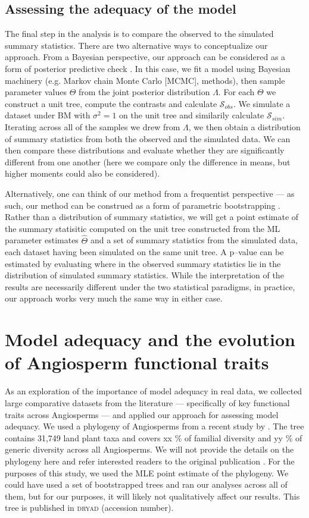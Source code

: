 \documentclass[a4paper,12pt]{article}
\begin{document}
\subsection{Assessing the adequacy of the model}
The final step in the analysis is to compare the observed to the simulated summary statistics. There are two alternative ways to conceptualize our approach. From a Bayesian perspective, our approach can be considered as a form of posterior predictive check \citep{Rubin1984, Gelman1996, Gelmanbook}. In this case, we fit a model using Bayesian machinery (e.g. Markov chain Monte Carlo [MCMC], methods), then sample parameter values $\Theta$ from the joint posterior distribution $\Lambda$. For each $\Theta$ we construct a unit tree, compute the contrasts and calculate $\mathcal{S}_{obs}$. We simulate a dataset under BM with $\sigma^2 = 1$ on the unit tree and similarily calculate $\mathcal{S}_{sim}$. Iterating across all of the samples we drew from $\Lambda$, we then obtain a distribution of summary statistics from both the observed and the simulated data. We can then compare these distributions and evaluate whether they are significantly different from one another (here we compare only the difference in means, but higher moments could also be considered). 

Alternatively, one can think of our method from a frequentist perspective --- as such, our method can be construed as a form of parametric bootstrapping \citep{Efronbootstrap}. Rather than a distribution of summary statistics, we will get a point estimate of the summary statisitic computed on the unit tree constructed from the ML parameter estimates $\hat{\Theta}$ and a set of summary statistics from the simulated data, each dataset having been simulated on the same unit tree. A p--value can be estimated by evaluating where in the observed summary statistics lie in the distribution of simulated summary statistics. While the interpretation of the results are necessarily different under the two statistical paradigms, in practice, our approach works very much the same way in either case.

\section*{Model adequacy and the evolution of Angiosperm functional traits}
As an exploration of the importance of model adequacy in real data, we collected large comparative datasets from the literature --- specifically of key functional traits across Angiosperms --- and applied our approach for assessing model adequacy. We used a phylogeny of Angiosperms from a recent study by \citet{Zanne2013}. The tree contains 31,749 land plant taxa and covers xx \% of familial diversity and yy \% of generic diversity across all Angiosperms. We will not provide the details on the phylogeny here and refer interested readers to the original publication \citep{Zanne2013}. For the purposes of this study, we used the MLE point estimate of the phylogeny. We could have used a set of bootstrapped trees and ran our analyses across all of them, but for our purposes, it will likely not qualitatively affect our results. This tree is published in \textsc{dryad} (accession number).
\end{document}
